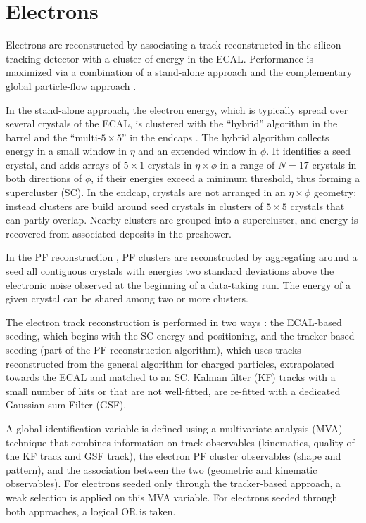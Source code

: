 \section{Electrons}
Electrons are reconstructed by associating a track reconstructed in the silicon tracking detector with a cluster of energy in the ECAL. Performance is maximized via a combination of a stand-alone approach and the complementary global particle-flow approach \citep{JINST-2015-10-P06005}. 

In the stand-alone approach, the electron energy, which is typically spread over several crystals of the ECAL, is clustered with the ``hybrid'' algorithm in the barrel and the ``multi-$5\times 5$'' in the endcaps \citep{JINST-2015-10-P06005}. The hybrid algorithm collects energy in a small window in $\eta$ and an extended window in $\phi$. It identifies a seed crystal, and adds arrays of $5 \times 1$ crystals in $\eta \times \phi$ in a range of $N = 17$ crystals in both directions of $\phi$, if their energies exceed a minimum threshold, thus forming a supercluster (SC).  In the endcap, crystals are not arranged in an $\eta \times \phi$ geometry; instead clusters are build around seed crystals in clusters of $5\times 5$ crystals that can partly overlap. Nearby clusters are grouped into a supercluster, and energy is recovered from associated deposits in the preshower. 

In the PF reconstruction \citep{JINST-2015-10-P06005}, PF clusters are reconstructed by aggregating around a seed all contiguous crystals with energies two standard deviations above the electronic noise observed at the beginning of a data-taking run. The energy of a given crystal can be shared among two or more clusters.

The electron track reconstruction is performed in two ways \citep{JINST-2015-10-P06005}: the ECAL-based seeding, which begins with the SC energy and positioning, and the tracker-based seeding (part of the PF reconstruction algorithm), which uses tracks reconstructed from the general algorithm for charged particles, extrapolated towards the ECAL and matched to an SC. Kalman filter (KF) tracks with a small number of hits or that are not well-fitted, are re-fitted with a dedicated Gaussian sum Filter (GSF).

A global identification variable \citep{JINST-2015-10-P06005} is defined using a multivariate analysis (MVA) technique that combines information on track observables (kinematics, quality of the KF track and GSF track), the electron PF cluster observables (shape and pattern), and the association between the two (geometric and kinematic observables). For electrons seeded only through the tracker-based approach, a weak selection is applied on this MVA variable. For electrons seeded through both approaches, a logical OR is taken. 

